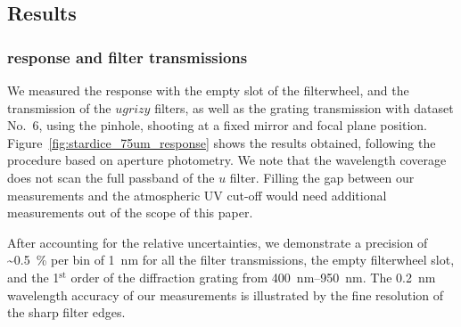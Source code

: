 %
%
%
%

\subsection{Results}
\subsubsection{\SD response and filter transmissions}

We measured the \SD response with the empty slot of the filterwheel, and the transmission of the $ugrizy$ filters, as well as the grating transmission with dataset No.~6, using the \spinhole pinhole, shooting at a fixed mirror and focal plane position. Figure~\ref{fig:stardice_75um_response} shows the results obtained, following the procedure based on aperture photometry. We note that the wavelength coverage does not scan the full passband of the $u$ filter. Filling the gap between our measurements and the atmospheric UV cut-off would need additional measurements out of the scope of this paper.

After accounting for the relative uncertainties, we demonstrate a precision of \textasciitilde\SI{0.5}{\%} per bin of \SI{1}{nm} for all the filter transmissions, the empty filterwheel slot, and the 1$^\mathrm{st}$ order of the diffraction grating from \SIrange{400}{950}{\nano\meter}. The \SI{0.2}{nm} wavelength accuracy of our measurements is illustrated by the fine resolution of the sharp filter edges.



